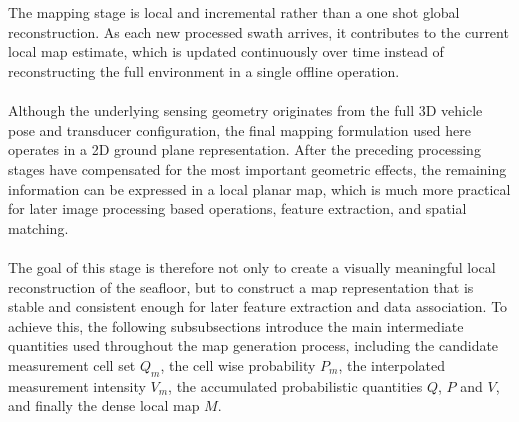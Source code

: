 \\ \\
The mapping stage is local and incremental rather than a one shot global reconstruction. As each new processed swath arrives, it contributes to the current local map estimate, which is updated continuously over time instead of reconstructing the full environment in a single offline operation.
\\ \\
Although the underlying sensing geometry originates from the full 3D vehicle pose and transducer configuration, the final mapping formulation used here operates in a 2D ground plane representation. After the preceding processing stages have compensated for the most important geometric effects, the remaining information can be expressed in a local planar map, which is much more practical for later image processing based operations, feature extraction, and spatial matching.
\\ \\
The goal of this stage is therefore not only to create a visually meaningful local reconstruction of the seafloor, but to construct a map representation that is stable and consistent enough for later feature extraction and data association. To achieve this, the following subsubsections introduce the main intermediate quantities used throughout the map generation process, including the candidate measurement cell set $Q_m$, the cell wise probability $P_m$, the interpolated measurement intensity $V_m$, the accumulated probabilistic quantities $Q$, $P$ and $V$, and finally the dense local map $M$.



\newpage



